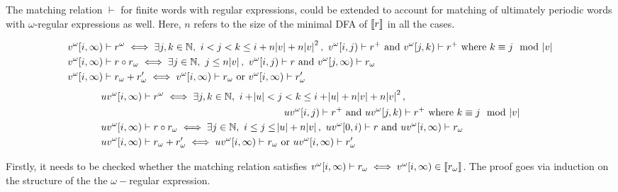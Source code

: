 \begin{definition}
The matching relation $\vdash$ for finite words with regular expressions, could be extended to account for matching of ultimately periodic words with $\omega$-regular expressions as well. Here, $n$ refers to the size of the minimal DFA of ${\llbracket}r{\rrbracket}$ in all the cases.

 \begin{align*}
        &v^\omega[i,\infty)\vdash  r^\omega   \iff  \exists j, k\in \mathbb{N},\ i<j<k\leq i+n\abs{v}+n\abs{v}^2,\ v^\omega[i,j)\vdash r^+  \text{ and } v^\omega[j,k) \vdash r^+ \text{ where } k\equiv j\mod \abs{v}\\
    &v^\omega[i,\infty) 
    \vdash r\circ r_\omega \iff  \exists j\in \mathbb{N},\ j\leq n\abs{v},\ v^\omega[i,j)\vdash r \text{ and } v^\omega[j,\infty)\vdash r_\omega\\
    &v^\omega[i,\infty) \vdash r_\omega+ r_\omega^{\prime} \iff   v^\omega[i,\infty)\vdash r_\omega \text{ or } v^\omega[i,\infty)\vdash r_\omega^{\prime}
\end{align*}
 \begin{align*}
        &uv^\omega[i,\infty)\vdash  r^\omega   \iff  \exists j, k\in \mathbb{N},\ i+\abs{u} < j<k\leq i+\abs{u}+n\abs{v}+n\abs{v}^2,\ \\&\hspace{6.5cm} uv^\omega[i,j)\vdash r^+  \text{ and } uv^\omega[j,k) \vdash r^+ \text{ where } k\equiv j\mod \abs{v}\\
    &uv^\omega[i,\infty) \vdash r\circ r_\omega \iff  \exists j\in \mathbb{N},\ i\leq j\leq\abs{u}+ n\abs{v},\ uv^\omega[0,i)\vdash r \text{ and } uv^\omega[i,\infty)\vdash r_\omega\\
    &uv^\omega[i,\infty) \vdash r_\omega+ r_\omega^{\prime} \iff   uv^\omega[i,\infty)\vdash r_\omega \text{ or } uv^\omega[i,\infty)\vdash r_\omega^{\prime}
\end{align*}

\end{definition}
Firstly, it needs to be checked whether the matching relation satisfies ${v^\omega[i,\infty)\vdash r_\omega \iff v^\omega[i,\infty)\in {\llbracket}r_\omega{\rrbracket}}$.
The proof goes via induction on the structure of the the $\omega-$regular expression. 
